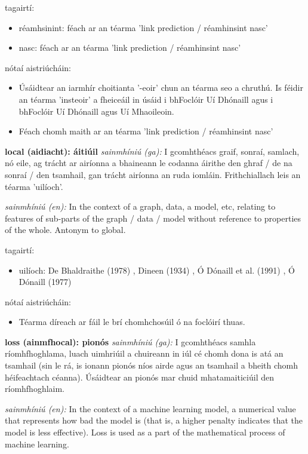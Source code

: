 \documentclass{article}
\begin{document}
tagairtí:
\begin{itemize}
	\item réamhsinint: féach ar an téarma 'link prediction / réamhinsint nasc'
	\item nasc: féach ar an téarma 'link prediction / réamhinsint nasc'
\end{itemize}

nótaí aistriúcháin:
\begin{itemize}
	\item Úsáidtear an iarmhír choitianta '-eoir' chun an téarma seo a chruthú. Is féidir an téarma 'insteoir' a fheiceáil in úsáid i bhFoclóir Uí Dhónaill agus i bhFoclóir Uí Dhónaill agus Uí Mhaoileoin.
	\item Féach chomh maith ar an téarma 'link prediction / réamhinsint nasc'
\end{itemize}


\textbf{local (aidiacht): áitiúil}
\textit{sainmhíniú (ga):} I gcomhthéacs graif, sonraí, samlach, nó eile, ag trácht ar airíonna a bhaineann le codanna áirithe den ghraf / de na sonraí / den tsamhail, gan trácht airíonna an ruda iomláin. Frithchiallach leis an téarma 'uilíoch'.

\textit{sainmhíniú (en):} In the context of a graph, data, a model, etc, relating to features of sub-parts of the graph / data / model without reference to properties of the whole. Antonym to global.

tagairtí:
\begin{itemize}
	\item uilíoch: De Bhaldraithe (1978) \cite{de-bhaldraithe}, Dineen (1934) \cite{dineen}, Ó Dónaill et al. (1991) \cite{focloir-beag}, Ó Dónaill (1977) \cite{odonaill}
\end{itemize}

nótaí aistriúcháin:
\begin{itemize}
	\item Téarma díreach ar fáil le brí chomhchosúil ó na foclóirí thuas.
\end{itemize}


\textbf{loss (ainmfhocal): pionós}
\textit{sainmhíniú (ga):} I gcomhthéacs samhla ríomhfhoghlama, luach uimhriúil a chuireann in iúl cé chomh dona is atá an tsamhail (sin le rá, is ionann pionós níos airde agus an tsamhail a bheith chomh héifeachtach céanna). Úsáidtear an pionós mar chuid mhatamaiticiúil den ríomhfhoghlaim.

\textit{sainmhíniú (en):} In the context of a machine learning model, a numerical value that represents how bad the model is (that is, a higher penalty indicates that the model is less effective). Loss is used as a part of the mathematical process of machine learning.
\end{document}

